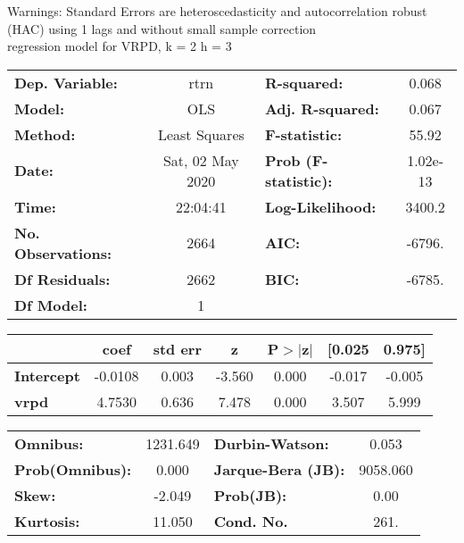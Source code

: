 Warnings: \newline
 [1] Standard Errors are heteroscedasticity and autocorrelation robust (HAC) using 1 lags and without small sample correction\\ 

regression model for VRPD, k = 2 h = 3\begin{center}
\begin{tabular}{lclc}
\toprule
\textbf{Dep. Variable:}    &       rtrn       & \textbf{  R-squared:         } &     0.068   \\
\textbf{Model:}            &       OLS        & \textbf{  Adj. R-squared:    } &     0.067   \\
\textbf{Method:}           &  Least Squares   & \textbf{  F-statistic:       } &     55.92   \\
\textbf{Date:}             & Sat, 02 May 2020 & \textbf{  Prob (F-statistic):} &  1.02e-13   \\
\textbf{Time:}             &     22:04:41     & \textbf{  Log-Likelihood:    } &    3400.2   \\
\textbf{No. Observations:} &        2664      & \textbf{  AIC:               } &    -6796.   \\
\textbf{Df Residuals:}     &        2662      & \textbf{  BIC:               } &    -6785.   \\
\textbf{Df Model:}         &           1      & \textbf{                     } &             \\
\bottomrule
\end{tabular}
\begin{tabular}{lcccccc}
                   & \textbf{coef} & \textbf{std err} & \textbf{z} & \textbf{P$> |$z$|$} & \textbf{[0.025} & \textbf{0.975]}  \\
\midrule
\textbf{Intercept} &      -0.0108  &        0.003     &    -3.560  &         0.000        &       -0.017    &       -0.005     \\
\textbf{vrpd}      &       4.7530  &        0.636     &     7.478  &         0.000        &        3.507    &        5.999     \\
\bottomrule
\end{tabular}
\begin{tabular}{lclc}
\textbf{Omnibus:}       & 1231.649 & \textbf{  Durbin-Watson:     } &    0.053  \\
\textbf{Prob(Omnibus):} &   0.000  & \textbf{  Jarque-Bera (JB):  } & 9058.060  \\
\textbf{Skew:}          &  -2.049  & \textbf{  Prob(JB):          } &     0.00  \\
\textbf{Kurtosis:}      &  11.050  & \textbf{  Cond. No.          } &     261.  \\
\bottomrule
\end{tabular}
\end{center}

